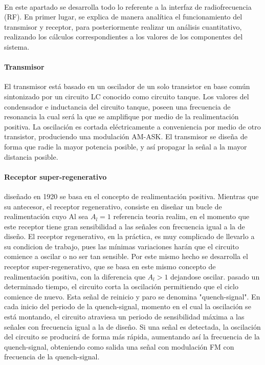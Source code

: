\paragraph{} En este apartado se desarrolla todo lo referente a la interfaz de radiofrecuencia (RF). En primer lugar, se explica de manera analítica el funcionamiento del transmisor y receptor, para posteriormente realizar un análisis cuantitativo, realizando los cálculos correspondientes a los valores de los componentes del sistema.

\paragraph{Transmisor} El transmisor está basado en un oscilador de un solo transistor en base com\'un sintonizado por un circuito LC conocido como circuito tanque.
Los valores del condensador e inductancia del circuito tanque, poseen una frecuencia de resonancia la cual será la que se amplifique por medio de la realimentación positiva. La oscilación es cortada eléctricamente a conveniencia por medio de otro transistor, produciendo una modulación AM-ASK. El transmisor se diseña de forma que radie la mayor potencia posible, y así propagar la señal a la mayor distancia posible.

\paragraph{Receptor super-regenerativo} diseñado en 1920 se basa en el concepto de realimentación positiva. Mientras que su antecesor, el receptor regenerativo, consiste en diseñar un bucle de realimentación cuyo Al sea $A_l = 1$ referencia teoria realim, en el momento que este receptor tiene gran sensibilidad a las señales con frecuencia igual a la de diseño. El receptor regenerativo, en la práctica, es muy complicado de llevarlo a su condicion de trabajo, pues las mínimas variaciones harán que el circuito comience a oscilar o no ser tan sensible. Por este mismo hecho se desarrolla el receptor super-regenerativo, que se basa en este mismo concepto de realimentación positiva, con la diferencia que $A_l > 1$ dejandose oscilar. pasado un determinado tiempo, el circuito corta la oscilación permitiendo que el ciclo comience de nuevo. Esta señal de reinicio y paro se denomina "quench-signal". En cada inicio del periodo de la quench-signal, momento en el cual la oscilación se está montando, el circuito atraviesa un periodo de sensibilidad máxima a las señales con frecuencia igual a la de diseño. Si una señal es detectada, la oscilación del circuito se producirá de forma más rápida, aumentando así la frecuencia de la quench-signal, obteniendo como salida una señal con modulación FM con frecuencia de la quench-signal.

